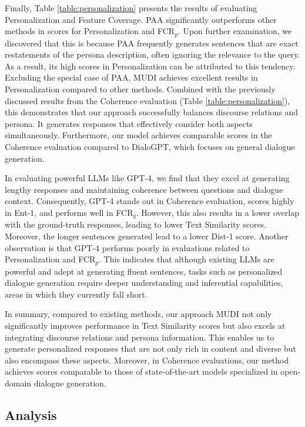 \documentclass[letterpaper]{article} %
\begin{document}
Finally, Table \ref{table:personalization} presents the results of evaluating Personalization and Feature Coverage. PAA significantly outperforms other methods in scores for Personalization and FCR$_p$. Upon further examination, we discovered that this is because PAA frequently generates sentences that are exact restatements of the persona description, often ignoring the relevance to the query. As a result, its high scores in Personalization can be attributed to this tendency. Excluding the special case of PAA, MUDI achieves excellent results in Personalization compared to other methods. Combined with the previously discussed results from the Coherence evaluation (Table \ref{table:personalization}), this demonstrates that our approach successfully balances discourse relations and persona. It generates responses that effectively consider both aspects simultaneously. Furthermore, our model achieves comparable scores in the Coherence evaluation compared to DialoGPT, which focuses on general dialogue generation.

In evaluating powerful LLMs like GPT-4, we find that they excel at generating lengthy responses and maintaining coherence between questions and dialogue context. Consequently, GPT-4 stands out in Coherence evaluation, scores highly in Ent-1, and performs well in FCR$_q$. However, this also results in a lower overlap with the ground-truth responses, leading to lower Text Similarity scores. Moreover, the longer sentences generated lead to a lower Dist-1 score. Another observation is that GPT-4 performs poorly in evaluations related to Personalization and FCR$_p$. This indicates that although existing LLMs are powerful and adept at generating fluent sentences, tasks such as personalized dialogue generation require deeper understanding and inferential capabilities, areas in which they currently fall short.

In summary, compared to existing methods, our approach MUDI not only significantly improves performance in Text Similarity scores but also excels at integrating discourse relations and persona information. This enables us to generate personalized responses that are not only rich in content and diverse but also encompass these aspects. Moreover, in Coherence evaluations, our method achieves scores comparable to those of state-of-the-art models specialized in open-domain dialogue generation.

\subsection{Analysis}
\end{document}
